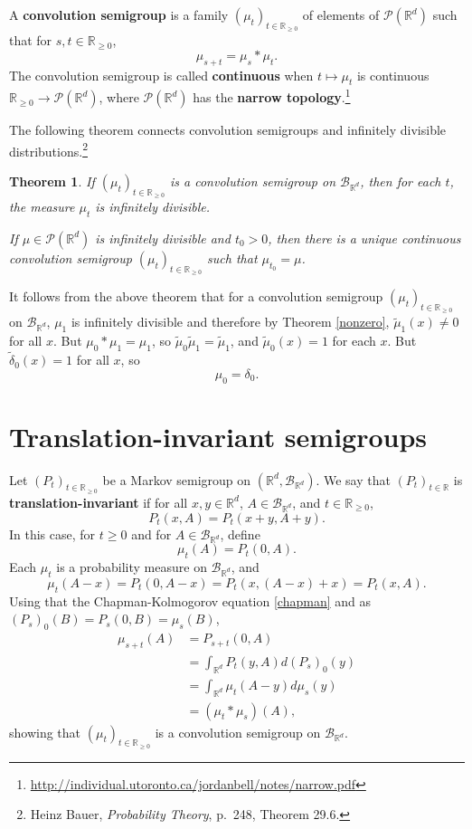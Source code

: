 \documentclass{article}
\newtheorem{theorem}{Theorem}
\theoremstyle{definition}
\begin{document}
A \textbf{convolution semigroup} is a family $(\mu_t)_{t \in \mathbb{R}_{\geq 0}}$ of elements
of $\mathscr{P}(\mathbb{R}^d)$ such that 
for $s,t \in \mathbb{R}_{\geq 0}$,
\[
\mu_{s+t} = \mu_s * \mu_t.
\]
The convolution semigroup is called \textbf{continuous} when $t \mapsto \mu_t$
is continuous $\mathbb{R}_{\geq 0} \to \mathscr{P}(\mathbb{R}^d)$, where $\mathscr{P}(\mathbb{R}^d)$
has the \textbf{narrow topology}.\footnote{\url{http://individual.utoronto.ca/jordanbell/notes/narrow.pdf}}

The following theorem connects convolution semigroups and infinitely divisible distributions.\footnote{Heinz
Bauer, {\em Probability Theory}, p.~248, Theorem 29.6.}

\begin{theorem}
If $(\mu_t)_{t \in \mathbb{R}_{\geq 0}}$ is a convolution semigroup on
$\mathscr{B}_{\mathbb{R}^d}$, then for each
$t$, the measure $\mu_t$ is infinitely divisible. 

If $\mu \in \mathscr{P}(\mathbb{R}^d)$ is infinitely divisible and $t_0>0$, then there is a unique continuous convolution
semigroup $(\mu_t)_{t \in \mathbb{R}_{\geq 0}}$ such that $\mu_{t_0}=\mu$. 
\end{theorem}

It follows from the above theorem that for a convolution semigroup $(\mu_t)_{t \in \mathbb{R}_{\geq 0}}$
on $\mathscr{B}_{\mathbb{R}^d}$,
$\mu_1$ is infinitely divisible and therefore by Theorem \ref{nonzero}, $\tilde{\mu}_1(x) \neq 0$ for all $x$.
But $\mu_0 * \mu_1 = \mu_1$, so $\tilde{\mu}_0 \tilde{\mu}_1 = \tilde{\mu}_1$, and $\tilde{\mu}_0(x)=1$ for each
$x$. But $\tilde{\delta}_0(x)=1$ for all $x$, so
\begin{equation}
\mu_0=\delta_0.
\label{delta0}
\end{equation}


\section{Translation-invariant semigroups}
Let $(P_t)_{t \in \mathbb{R}_{\geq 0}}$ be a Markov semigroup on $(\mathbb{R}^d,\mathscr{B}_{\mathbb{R}^d})$.
We say that $(P_t)_{t \in \mathbb{R}}$ is \textbf{translation-invariant} if for all
$x,y \in \mathbb{R}^d$, $A \in \mathscr{B}_{\mathbb{R}^d}$, and $t \in \mathbb{R}_{\geq 0}$,
\[
P_t(x,A) = P_t(x+y,A+y).
\]
In this case, for $t \geq 0$ and for $A \in \mathscr{B}_{\mathbb{R}^d}$, define
\[
\mu_t(A) = P_t(0,A).
\]
Each $\mu_t$ is a probability measure on $\mathscr{B}_{\mathbb{R}^d}$, and
\[
\mu_t(A-x) = P_t(0,A-x) = P_t(x,(A-x)+x) = P_t(x,A).
\]
Using that the Chapman-Kolmogorov equation \eqref{chapman} and as
$(P_s)_0(B)=P_s(0,B)=\mu_s(B)$,
\begin{align*}
\mu_{s+t}(A)&=P_{s+t}(0,A)\\
&=\int_{\mathbb{R}^d} P_t(y,A) d(P_s)_0(y)\\
&=\int_{\mathbb{R}^d} \mu_t(A-y) d\mu_s(y)\\
&=(\mu_t * \mu_s)(A),
\end{align*}
showing that $(\mu_t)_{t \in \mathbb{R}_{\geq 0}}$ is a convolution semigroup on $\mathscr{B}_{\mathbb{R}^d}$.
\end{document}
